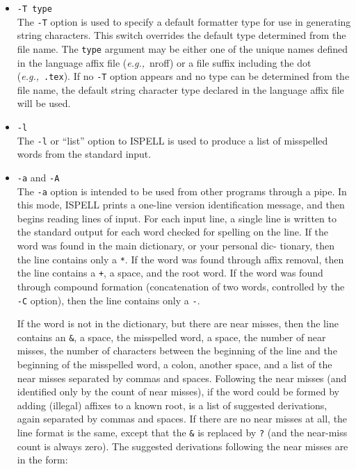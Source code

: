 \documentclass[twoside,11pt]{article}
\begin{document}
\begin{itemize}
\item {\Large\tt -T type}\\
The \verb+-T+ option is used to specify a default formatter type for use in
generating string characters.
This switch overrides the default type determined from the file name.
The \verb+type+ argument may be either one of the unique names defined in the
language affix file ({\it{e.g.,}}\ nroff) or a file suffix including the dot
({\it{e.g.,}}\ \verb+.tex+)\@.  If no \verb+-T+ option appears and no type
can be determined from the file name, the default string character type
declared in the language affix file will be used.

\item {\Large\tt -l}\\
The \verb+-l+ or ``list'' option to ISPELL is used to produce a list of
misspelled words from the standard input.

\item {\Large\tt -a} and {\Large\tt -A}\\
The \verb+-a+ option is intended to be used from other programs through a pipe.
In this mode, ISPELL prints a one-line version identification message, and
then begins reading lines of input.
For each input line, a single line is written to the standard output for each
word checked for spelling on the line.
If the word was found in the main dictionary, or your personal dic-
tionary, then the line contains only a \verb+*+\@.
If the word was found through affix removal, then the line contains a \verb-+-,
a space, and the root word.
If the word was found through compound formation (concatenation of two words,
controlled by the \verb+-C+ option), then the line contains only a \verb+-+\@.

If the word is not in the dictionary, but there are near misses, then the
line contains an \verb+&+, a space, the misspelled word, a space, the number of
near misses, the number of characters between the beginning of the line and
the beginning of the misspelled word, a colon, another space, and a list of
the near misses separated by commas and spaces.
Following the near misses (and identified only by the count of near misses), if
the word could be formed by adding (illegal) affixes to a known root, is a
list of suggested derivations, again separated by commas and spaces.
If there are no near misses at all, the line format is the same, except that
the \verb+&+ is replaced by \verb+?+ (and the near-miss count is always zero).
The suggested derivations following the near misses are in the form:


\end{itemize}
\end{document}
